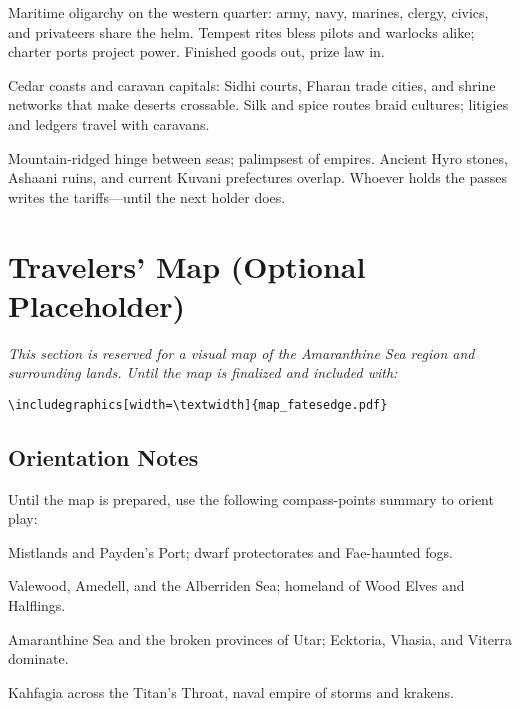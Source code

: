 \documentclass[11pt]{book}
\begin{document}
\begin{description}[leftmargin=2.2cm]
  \item[Kahfagia] Maritime oligarchy on the western quarter: army, navy, marines, clergy, civics, and privateers share the helm. Tempest rites bless pilots and warlocks alike; charter ports project power. Finished goods out, prize law in.

  \item[Galanina \& Fharan Lands] Cedar coasts and caravan capitals: Sidhi courts, Fharan trade cities, and shrine networks that make deserts crossable. Silk and spice routes braid cultures; litigies and ledgers travel with caravans.

  \item[Haayr Peninsula] Mountain-ridged hinge between seas; palimpsest of empires. Ancient Hyro stones, Ashaani ruins, and current Kuvani prefectures overlap. Whoever holds the passes writes the tariffs—until the next holder does.
\end{description}

\section{Travelers' Map (Optional Placeholder)}

\noindent
\textit{This section is reserved for a visual map of the Amaranthine Sea region and surrounding lands. Until the map is finalized and included with:}  
\begin{center}
  \texttt{\textbackslash includegraphics[width=\textbackslash textwidth]\{map\_fatesedge.pdf\}}
\end{center}

\subsection*{Orientation Notes}
Until the map is prepared, use the following compass-points summary to orient play:  

\begin{description}[leftmargin=2cm]
  \item[North] Mistlands and Payden’s Port; dwarf protectorates and Fae-haunted fogs.  
  \item[East] Valewood, Amedell, and the Alberriden Sea; homeland of Wood Elves and Halflings.  
  \item[South] Amaranthine Sea and the broken provinces of Utar; Ecktoria, Vhasia, and Viterra dominate.  
  \item[West] Kahfagia across the Titan’s Throat, naval empire of storms and krakens.  
\end{description}
\end{document}
